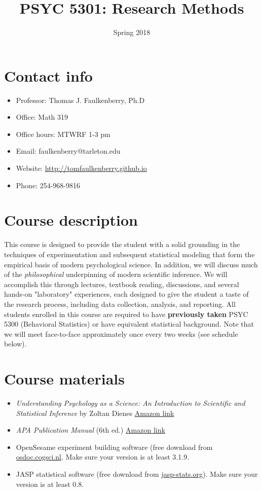 \documentclass[10pt]{article}
\date{Spring 2018}
\title{PSYC 5301: Research Methods}
\begin{document}
\maketitle

\section*{Contact info}
\label{sec-1}
\begin{itemize}
\item Professor: Thomas J. Faulkenberry, Ph.D
\item Office: Math 319
\item Office hours: MTWRF 1-3 pm
\item Email: faulkenberry@tarleton.edu
\item Website: \url{http://tomfaulkenberry.github.io}
\item Phone: 254-968-9816
\end{itemize}

\section*{Course description}
\label{sec-2}

This course is designed to provide the student with a solid grounding in the techniques of experimentation and subsequent statistical modeling that form the empirical basis of modern psychological science.  In addition, we will discuss much of the \emph{philosophical} underpinning of modern scientific inference.  We will accomplish this through lectures, textbook reading, discussions, and several hands-on "laboratory" experiences, each designed to give the student a taste of the research process, including data collection, analysis, and reporting. All students enrolled in this course are required to have \textbf{previously taken} PSYC 5300 (Behavioral Statistics) or have equivalent statistical background.  Note that we will meet face-to-face approximately once every two weeks (see schedule below). 

\section*{Course materials}
\label{sec-3}

\begin{itemize}
\item \emph{Understanding Psychology as a Science: An Introduction to Scientific and Statistical Inference} by Zoltan Dienes \href{https://www.amazon.com/Understanding-Psychology-Science-Introduction-Statistical/dp/023054231X}{Amazon link}
\item \emph{APA Publication Manual} (6th ed.) \href{http://www.amazon.com/Publication-Manual-American-Psychological-Association/dp/1433805618/}{Amazon link}
\item OpenSesame experiment building software (free download from \href{http://osdoc.cogsci.nl/3.1/download/}{osdoc.cogsci.nl}.  Make sure your version is at least 3.1.9.
\item JASP statistical software (free download from \href{http://jasp-stats.org}{jasp-stats.org}).  Make sure your version is at least 0.8.
\end{itemize}
\end{document}
